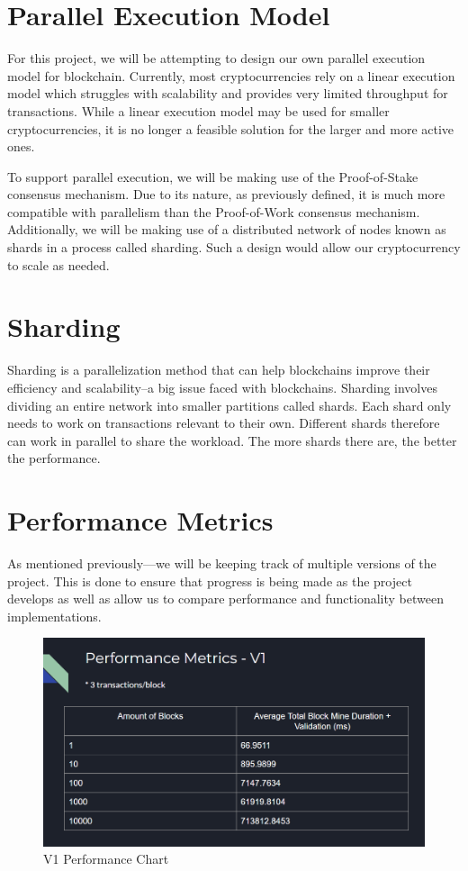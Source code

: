 \section{Parallel Execution Model}

For this project, we will be attempting to design our own parallel execution model for blockchain. Currently, most cryptocurrencies rely on a linear execution model which struggles with scalability and provides very limited throughput for transactions. While a linear execution model may be used for smaller cryptocurrencies, it is no longer a feasible solution for the larger and more active ones.

To support parallel execution, we will be making use of the Proof-of-Stake consensus mechanism. Due to its nature, as previously defined, it is much more compatible with parallelism than the Proof-of-Work consensus mechanism. Additionally, we will be making use of a distributed network of nodes known as shards in a process called sharding. Such a design would allow our cryptocurrency to scale as needed.

\section{Sharding}

Sharding is a parallelization method that can help blockchains improve their efficiency and scalability–a big issue faced with blockchains. Sharding involves dividing an entire network into smaller partitions called shards. Each shard only needs to work on transactions relevant to their own. Different shards therefore can work in parallel to share the workload. The more shards there are, the better the performance.

\section{Performance Metrics}

As mentioned previously—we will be keeping track of multiple versions of the project. This is done to ensure that progress is being made as the project develops as well as allow us to compare performance and functionality between implementations.

\begin{figure}[!ht]
   \centering
   \includegraphics[width=120mm]{fig/V1.PNG}
   \caption{V1 Performance Chart}
\end{figure}

